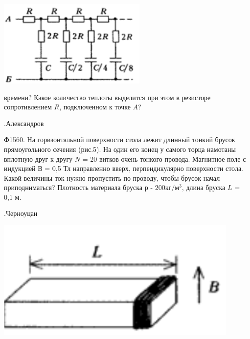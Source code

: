 \documentclass{article}
\begin{document}
{\begin{minipage}[t]{0.47\textwidth}
  \end{minipage}
  \hfill
  \begin{minipage}[t]{0.5\textwidth}
    \hfill
    \begin{center}
      \includegraphics[width=0.55\textwidth]{src/4-picture.png}
    \end{center}
    времени? Какое количество теплоты выделится при этом в резисторе сопротивлением $R$, подключенном к точке $A$?
    \begin{flushright}.Александров\end{flushright}
    Ф1560. На горизонтальной поверхности стола лежит длинный тонкий брусок прямоугольного сечения (рис.5). На один его конец у самого торца намотаны вплотную друг к другу $N$ = 20 витков очень тонкого провода. Магнитное поле с индукцией $В$ = 0,5 Тл направленно вверх, перпендикулярно поверхности стола. Какой величины ток нужно пропустить по проводу, чтобы брусок начал приподниматься? Плотность материала бруска $р$ - $200 кг/м^3$, длина бруска $L$ = 0,1 м.
    \begin{flushright}.Черноуцан\end{flushright}
    \begin{minipage}[t]{0.45\textwidth}
      \begin{center}
        \includegraphics[width=0.9\textwidth]{src/5-picture.png}
      \end{center}  
    \end{minipage}

\end{minipage}}
\end{document}
